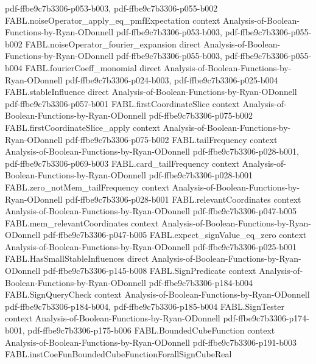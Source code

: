 \begin{theorem}
  {pdf-ffbe9c7b3306-p053-b003,
    pdf-ffbe9c7b3306-p055-b002}
\proofstep
  {FABL.noiseOperator_apply_eq_pmfExpectation}
  {context}
  {Analysis-of-Boolean-Functions-by-Ryan-ODonnell}
  {pdf-ffbe9c7b3306-p053-b003,
    pdf-ffbe9c7b3306-p055-b002}
\proofstep
  {FABL.noiseOperator_fourier_expansion}
  {direct}
  {Analysis-of-Boolean-Functions-by-Ryan-ODonnell}
  {pdf-ffbe9c7b3306-p055-b003,
    pdf-ffbe9c7b3306-p055-b004}
\proofstep
  {FABL.fourierCoeff_monomial}
  {direct}
  {Analysis-of-Boolean-Functions-by-Ryan-ODonnell}
  {pdf-ffbe9c7b3306-p024-b003,
    pdf-ffbe9c7b3306-p025-b004}
\proofstep
  {FABL.stableInfluence}
  {direct}
  {Analysis-of-Boolean-Functions-by-Ryan-ODonnell}
  {pdf-ffbe9c7b3306-p057-b001}
\proofstep
  {FABL.firstCoordinateSlice}
  {context}
  {Analysis-of-Boolean-Functions-by-Ryan-ODonnell}
  {pdf-ffbe9c7b3306-p075-b002}
\proofstep
  {FABL.firstCoordinateSlice_apply}
  {context}
  {Analysis-of-Boolean-Functions-by-Ryan-ODonnell}
  {pdf-ffbe9c7b3306-p075-b002}
\proofstep
  {FABL.tailFrequency}
  {context}
  {Analysis-of-Boolean-Functions-by-Ryan-ODonnell}
  {pdf-ffbe9c7b3306-p028-b001,
    pdf-ffbe9c7b3306-p069-b003}
\proofstep
  {FABL.card_tailFrequency}
  {context}
  {Analysis-of-Boolean-Functions-by-Ryan-ODonnell}
  {pdf-ffbe9c7b3306-p028-b001}
\proofstep
  {FABL.zero_notMem_tailFrequency}
  {context}
  {Analysis-of-Boolean-Functions-by-Ryan-ODonnell}
  {pdf-ffbe9c7b3306-p028-b001}
\proofstep
  {FABL.relevantCoordinates}
  {context}
  {Analysis-of-Boolean-Functions-by-Ryan-ODonnell}
  {pdf-ffbe9c7b3306-p047-b005}
\proofstep
  {FABL.mem_relevantCoordinates}
  {context}
  {Analysis-of-Boolean-Functions-by-Ryan-ODonnell}
  {pdf-ffbe9c7b3306-p047-b005}
\proofstep
  {FABL.expect_signValue_eq_zero}
  {context}
  {Analysis-of-Boolean-Functions-by-Ryan-ODonnell}
  {pdf-ffbe9c7b3306-p025-b001}
\proofstep
  {FABL.HasSmallStableInfluences}
  {direct}
  {Analysis-of-Boolean-Functions-by-Ryan-ODonnell}
  {pdf-ffbe9c7b3306-p145-b008}
\proofstep
  {FABL.SignPredicate}
  {context}
  {Analysis-of-Boolean-Functions-by-Ryan-ODonnell}
  {pdf-ffbe9c7b3306-p184-b004}
\proofstep
  {FABL.SignQueryCheck}
  {context}
  {Analysis-of-Boolean-Functions-by-Ryan-ODonnell}
  {pdf-ffbe9c7b3306-p184-b004,
    pdf-ffbe9c7b3306-p185-b004}
\proofstep
  {FABL.SignTester}
  {context}
  {Analysis-of-Boolean-Functions-by-Ryan-ODonnell}
  {pdf-ffbe9c7b3306-p174-b001,
    pdf-ffbe9c7b3306-p175-b006}
\proofstep
  {FABL.BoundedCubeFunction}
  {context}
  {Analysis-of-Boolean-Functions-by-Ryan-ODonnell}
  {pdf-ffbe9c7b3306-p191-b003}
\proofstep
  {FABL.instCoeFunBoundedCubeFunctionForallSignCubeReal}

\end{theorem}
